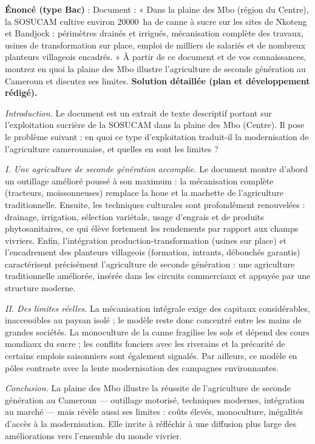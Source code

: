 \documentclass[11pt]{article}
\newcommand{\cle}[1]{{\popxbold\color{popdark}#1}}
\begin{document}
\begin{exoresolu}
\textbf{Énoncé (type Bac)} : Document : « Dans la plaine des Mbo (région du Centre), la SOSUCAM cultive environ \SI{20000}{ha} de canne à sucre sur les sites de Nkoteng et Bandjock : périmètres drainés et irrigués, mécanisation complète des travaux, usines de transformation sur place, emploi de milliers de salariés et de nombreux planteurs villageois encadrés. » À partir de ce document et de vos connaissances, montrez en quoi la plaine des Mbo illustre l'agriculture de seconde génération au Cameroun et discutez ses limites.
\tcblower
\textbf{Solution détaillée (plan et développement rédigé).}

\emph{Introduction.} Le document est un extrait de texte descriptif portant sur l'exploitation sucrière de la SOSUCAM dans la plaine des Mbo (Centre). Il pose le problème suivant : en quoi ce type d'exploitation traduit-il la modernisation de l'agriculture camerounaise, et quelles en sont les limites ?

\emph{I. Une agriculture de seconde génération accomplie.} Le document montre d'abord un \cle{outillage amélioré} poussé à son maximum : la mécanisation complète (tracteurs, moissonneuses) remplace la houe et la machette de l'agriculture traditionnelle. Ensuite, les \cle{techniques culturales} sont profondément renouvelées : drainage, irrigation, sélection variétale, usage d'engrais et de produits phytosanitaires, ce qui élève fortement les rendements par rapport aux champs vivriers. Enfin, l'intégration production-transformation (usines sur place) et l'encadrement des planteurs villageois (formation, intrants, débouchés garantis) caractérisent précisément l'\cle{agriculture de seconde génération} : une agriculture traditionnelle améliorée, insérée dans les circuits commerciaux et appuyée par une structure moderne.

\emph{II. Des limites réelles.} La mécanisation intégrale exige des capitaux considérables, inaccessibles au paysan isolé ; le modèle reste donc concentré entre les mains de grandes sociétés. La monoculture de la canne fragilise les sols et dépend des cours mondiaux du sucre ; les conflits fonciers avec les riverains et la précarité de certains emplois saisonniers sont également signalés. Par ailleurs, ce modèle en pôles contraste avec la lente modernisation des campagnes environnantes.

\emph{Conclusion.} La plaine des Mbo illustre la réussite de l'agriculture de seconde génération au Cameroun — outillage motorisé, techniques modernes, intégration au marché — mais révèle aussi ses limites : coûts élevés, monoculture, inégalités d'accès à la modernisation. Elle invite à réfléchir à une diffusion plus large des améliorations vers l'ensemble du monde vivrier.
\end{exoresolu}
\end{document}

